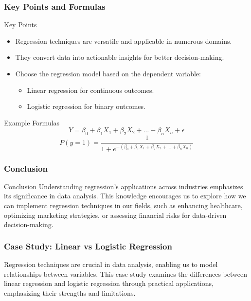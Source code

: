 \documentclass[aspectratio=169]{beamer}
\begin{document}
\begin{frame}[fragile]
    \frametitle{Key Points and Formulas}
    \begin{block}{Key Points}
        \begin{itemize}
            \item Regression techniques are versatile and applicable in numerous domains.
            \item They convert data into actionable insights for better decision-making.
            \item Choose the regression model based on the dependent variable: 
                \begin{itemize}
                    \item Linear regression for continuous outcomes.
                    \item Logistic regression for binary outcomes.
                \end{itemize}
        \end{itemize}
    \end{block}

    \begin{block}{Example Formulas}
        \begin{equation}
        Y = \beta_0 + \beta_1X_1 + \beta_2X_2 + \ldots + \beta_nX_n + \epsilon
        \end{equation}
        \begin{equation}
        P(y=1) = \frac{1}{1 + e^{-\left(\beta_0 + \beta_1X_1 + \beta_2X_2 + \ldots + \beta_nX_n\right)}}
        \end{equation}
    \end{block}
\end{frame}

\begin{frame}[fragile]
    \frametitle{Conclusion}
    \begin{block}{Conclusion}
        Understanding regression's applications across industries emphasizes its significance in data analysis. This knowledge encourages us to explore how we can implement regression techniques in our fields, such as enhancing healthcare, optimizing marketing strategies, or assessing financial risks for data-driven decision-making.
    \end{block}
\end{frame}

\begin{frame}[fragile]
    \frametitle{Case Study: Linear vs Logistic Regression}
    Regression techniques are crucial in data analysis, enabling us to model relationships between variables. This case study examines the differences between linear regression and logistic regression through practical applications, emphasizing their strengths and limitations.
\end{frame}
\end{document}
